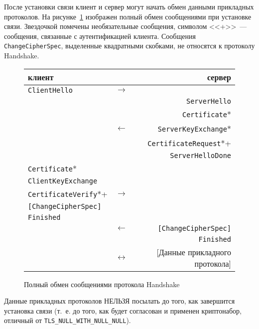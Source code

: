 После установки связи клиент и сервер могут начать обмен данными прикладных
протоколов. На рисунке~\ref{Fig.Handshake.1} изображен полный обмен
сообщениями при установке связи. Звездочкой помечены необязательные
сообщения, символом <<+>>~--- сообщения, связанные с аутентификацией
клиента. Сообщения \lstinline{ChangeCipherSpec}, выделенные квадратными
скобками, не относятся к протоколу Handshake.

\begin{figure}[bht]
\begin{center}
\begin{tabular}{lcr}
\hline
клиент  & \hspace{3cm} & сервер \\
\hline
\lstinline|ClientHello| & $\to$   &\\
\hline
	                    & 	      & \lstinline|ServerHello|\\
                        &         & \lstinline|Certificate|*\\ 
                        & $\gets$ & \lstinline|ServerKeyExchange|*\\ 
                        &  	      & \lstinline|CertificateRequest|*+\\ 
                        &  	      & \lstinline|ServerHelloDone|\\ 
\hline
\lstinline|Certificate|*        &       &\\ 
\lstinline|ClientKeyExchange|   & 		&\\ 
\lstinline|CertificateVerify|*+ & $\to$ &\\
\lstinline|[ChangeCipherSpec]|  &       &\\
\lstinline|Finished|            &       &\\ 
\hline
                       & $\gets$& \lstinline|[ChangeCipherSpec]|\\
                       &        & \lstinline|Finished|\\
\hline
[Данные прикладного протокола]  & 	$\leftrightarrow$	& 
[Данные прикладного протокола] \\
\hline
\end{tabular}     
\end{center}
\caption{Полный обмен сообщениями протокола Handshake}\label{Fig.Handshake.1}
\end{figure}

Данные прикладных протоколов НЕЛЬЗЯ посылать до того, как завершится 
установка связи (т.~е. до того, как будет согласован и применен 
криптонабор, отличный от \lstinline{TLS_NULL_WITH_NULL_NULL}). 

